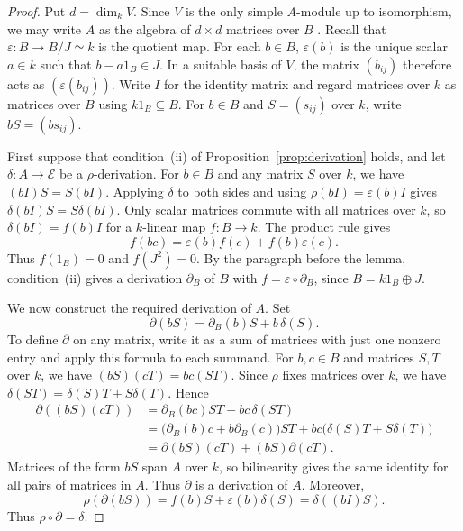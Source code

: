 \documentclass[11pt,a4paper]{article}
\theoremstyle{definition}
\theoremstyle{remark}
\numberwithin{equation}{section}
\begin{document}
	\begin{proof}
		Put $d=\dim_k V$. Since $V$ is the only simple $A$-module up to
		isomorphism, we may write $A$ as the algebra of $d\times d$ matrices
		over $B$ \cite[Proposition~4.7.17(i), (ii), (iv)]{Linckelmann2018a}.
		Recall that $\varepsilon:B\to B/J\simeq k$ is the quotient map.
		For each $b\in B$, $\varepsilon(b)$ is the unique scalar $a\in k$
		such that $b-a1_B\in J$. In a suitable basis of $V$, the matrix
		$(b_{ij})$ therefore acts as $(\varepsilon(b_{ij}))$.
		Write $I$ for the identity matrix and regard
		matrices over $k$ as matrices over $B$ using $k1_B\subseteq B$.
		For $b\in B$ and $S=(s_{ij})$ over $k$, write $bS=(bs_{ij})$.
		
		First suppose that condition~(ii) of Proposition~\ref{prop:derivation} holds,
		and let $\delta:A\to \mathcal{E}$ be a $\rho$-derivation. For $b\in B$ and any matrix $S$ over
		$k$, we have $(bI)S=S(bI)$. Applying $\delta$ to both sides and using
		$\rho(bI)=\varepsilon(b)I$ gives $\delta(bI)S=S\delta(bI)$.
		Only scalar matrices commute with all matrices over $k$, so
		$\delta(bI)=f(b)I$ for a $k$-linear map $f:B\to k$. The product rule gives
		\[
		f(bc)=\varepsilon(b)f(c)+f(b)\varepsilon(c).
		\]
		Thus $f(1_B)=0$ and $f(J^2)=0$. By the paragraph before the lemma,
		condition~(ii) gives a derivation $\partial_B$ of $B$ with
		$f=\varepsilon\circ\partial_B$, since $B=k1_B\oplus J$.
		
		We now construct the required derivation of $A$. Set
		\[
		\partial(bS)=\partial_B(b)S+b\,\delta(S).
		\]
		To define $\partial$ on any matrix, write it as a sum of matrices with
		just one nonzero entry and apply this formula to each summand.
		For $b,c\in B$ and matrices $S,T$ over $k$, we have $(bS)(cT)=bc(ST)$.
		Since $\rho$ fixes matrices over $k$, we have
		$\delta(ST)=\delta(S)T+S\delta(T)$. Hence
		\[
		\begin{aligned}
			\partial((bS)(cT))
			&= \partial_B(bc)ST+bc\,\delta(ST)\\
			&= \bigl(\partial_B(b)c+b\partial_B(c)\bigr)ST
			+bc\bigl(\delta(S)T+S\delta(T)\bigr)\\
			&= \partial(bS)(cT)+(bS)\partial(cT).
		\end{aligned}
		\]
		Matrices of the form $bS$ span $A$ over $k$, so bilinearity gives
		the same identity for all pairs of matrices in $A$. Thus $\partial$
		is a derivation of $A$.
		Moreover,
		\[
		\rho(\partial(bS))=f(b)S+\varepsilon(b)\delta(S)=\delta((bI)S).
		\]
		Thus $\rho\circ\partial=\delta$.
		

\end{proof}
\end{document}
